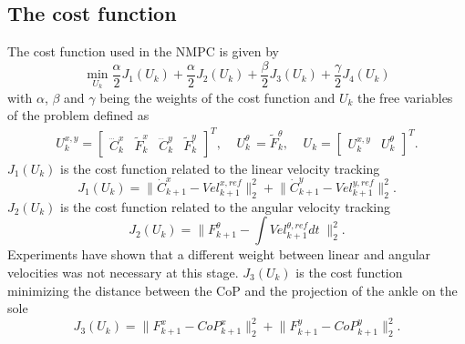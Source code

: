 \subsection{The cost function}
\label{SubSec:costFunction}

The cost function used in the NMPC is given by
\begin{equation}
    \min_{U_{k}} \frac{\alpha}{2} J_1(U_k)
               + \frac{\alpha}{2} J_2(U_k)
               + \frac{\beta}{2}  J_3(U_k)
               + \frac{\gamma}{2} J_4(U_k)
\end{equation}
with $\alpha$, $\beta$ and $\gamma$ being the weights of the cost function and $U_k$ the free variables of the problem defined as
\begingroup\makeatletter\def\f@size{9}\check@mathfonts
\def\maketag@@@#1{\hbox{\m@th\large\normalfont#1}}%
\begin{align}
  U_k^{x,y} =
  \begin{bmatrix}
    \dddot C_{k}^x &
    \tilde{F}_k^x  &
    \dddot C_{k}^y &
    \tilde{F}_k^y
  \end{bmatrix}^T
, \;\;\;\;
  U_k^{\theta} \,= \tilde{F}_k^{\theta}
, \;\;\;\;
  U_k =
  \begin{bmatrix}
    U_k^{x,y} &
    U_k^{\theta}
  \end{bmatrix}^T
  \label{eq:Uk}
  .
\end{align}
\endgroup
$J_1(U_k)$ is the cost function related to the linear velocity tracking
\begin{equation}
  J_1(U_k) = \lVert \dot C_{k+1}^{x} - {Vel}_{k+1}^{x,ref} \rVert^2_2
  +  \lVert \dot C_{k+1}^{y} - {Vel}_{k+1}^{y,ref} \rVert^2_2 \nonumber
  .
\end{equation}
$J_2(U_k)$ is the cost function related to the angular velocity tracking
\begin{equation}
  J_2(U_k) = \lVert F_{k+1}^\theta - \int {Vel}_{k+1}^{\theta,ref} dt \; \rVert_2^2 \nonumber
  .
\end{equation}
Experiments have shown that a different weight between linear and angular velocities was not necessary at this stage.
$J_3(U_k)$ is the cost function minimizing the distance between the CoP and the projection of the ankle on the sole
\begin{equation}
  J_3(U_k) = \lVert F_{k+1}^{x} - CoP_{k+1}^{x} \rVert^2_2 +
             \lVert F_{k+1}^{y} - CoP_{k+1}^{y} \rVert^2_2 
             .
\label{eq:cost_function_dist_to_copref}
\end{equation}
